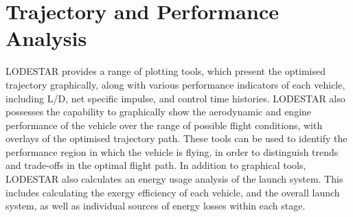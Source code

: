 \section{Trajectory and Performance Analysis}

LODESTAR provides a range of plotting tools, which present the optimised trajectory graphically, along with various performance indicators of each vehicle, including L/D, net specific impulse, and control time histories. LODESTAR also possesses the capability to graphically show the aerodynamic and engine performance of the vehicle over the range of possible flight conditions, with overlays of the optimised trajectory path. These tools can be used to identify the performance region in which the vehicle is flying, in order to distinguish trends and trade-offs in the optimal flight path. 
In addition to graphical tools, LODESTAR also calculates an energy usage analysis of the launch system. This includes calculating the exergy efficiency of each vehicle, and the overall launch system, as well as individual sources of energy losses within each stage.  

